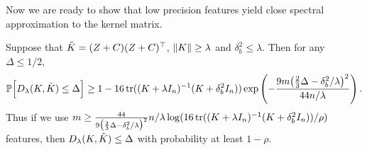 Now we are ready to show that low precision features yield close spectral
approximation to the kernel matrix.

\begin{theorem}
  Suppose that $\tilde{K} = (Z+C)(Z+C)^\top$, $\|K\| \geq \lambda$ and $\delta^2_b \leq \lambda$.
  Then for any $\Delta \leq 1/2$,
  \begin{equation*}
    \mathbb{P}\Big[D_{\lambda}(K,\tilde{K}) \leq \Delta\Big] \geq 1 - 16 \mathop{\rm tr}((K +
    \lambda I_n)^{-1} (K + \delta^2_b I_n)) \exp \left( -\frac{9m \big(\frac{2}{3}\Delta - \delta^2_b / \lambda\big)^2}{44n/\lambda} \right).
  \end{equation*}
  Thus if we use $m \geq \frac{44}{9 \big(\frac{2}{3}\Delta - \delta^2_b / \lambda\big)^2} n/\lambda \log (16 \mathop{\rm tr}((K + \lambda I_n)^{-1} (K +
  \delta^2_b I_n)) / \rho)$
  features, then $D_\lambda(K,\tilde{K})\leq \Delta$  with probability at least $1 - \rho$.
\end{theorem}


